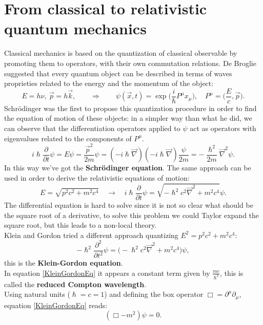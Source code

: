 \section{From classical to relativistic quantum mechanics}\label{sec:FromClassicalToRelativisticQM}
Classical mechanics is based on the quantization of classical observable by promoting them to operators, with their own commutation relations. De Broglie suggested that every quantum object can be described in terms of waves proprieties related to the energy and the momentum of the object:
\begin{equation*}
    E=h\nu,\ \vec p=h\vec k,\qquad \Rightarrow\qquad \psi(\vec x,t)=\exp\biggl(\frac{i}{\hslash}P^\mu x_\mu\biggr),\quad P^\mu=\bigg(\frac{E}{c},\vec p\bigg).
\end{equation*}
Schrödinger was the first to propose this quantization procedure in order to find the equation of motion of these objects: in a simpler way than what he did, we can observe that the differentiation operators applied to $\psi$ act as operators with eigenvalues related to the components of $P^\mu$.
\begin{equation*}
    i\hslash\frac{\partial}{\partial t}\psi=E\psi=\frac{{\vec p}^2}{2m}\psi=(-i\hslash\vec\nabla)(-i\hslash\vec\nabla)\frac{\psi}{2m}=-\frac{\hslash^2}{2m}{\vec\nabla}^2\psi.
\end{equation*}
In this way we've got the \textbf{Schrödinger equation}. The same approach can be used in order to derive the relativistic equations of motion:
\begin{equation*}
    E=\sqrt{p^2c^2+m^2c^4}\quad\rightarrow\quad i\hslash\frac{\partial}{\partial t}\psi=\sqrt{-\hslash^2c^2\vec\nabla^2+m^2c^4}\psi.
\end{equation*}
The differential equation is hard to solve since it is not so clear what should be the square root of a derivative, to solve this problem we could Taylor expand the square root, but this leads to a non-local theory.\\Klein and Gordon tried a different approach quantizing $E^2=p^2c^2+m^2c^4$:
\begin{equation}\label{KleinGordonEq}
    -\hslash^2\frac{\partial^2}{\partial t^2}\psi=\bigl(-\hslash^2c^2\vec\nabla^2+m^2c^4\bigr)\psi,
\end{equation} 
this is the \textbf{Klein-Gordon equation}.\\
In equation \eqref{KleinGordonEq} it appears a constant term given by $\frac{mc}{\hslash^2}$, this is called the \textbf{reduced Compton wavelength}.\\
Using natural units ($\hslash=c=1$) and defining the box operator $\Box=\partial^\mu\partial_\mu$, equation \eqref{KleinGordonEq} reads:
\begin{equation}\label{KleinGordonNU}
    (\Box-m^2)\psi=0.
\end{equation}

